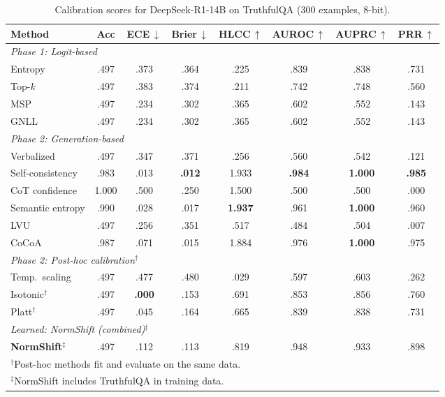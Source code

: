 \documentclass[11pt,a4paper]{article}
\begin{document}
\begin{table}[H]
\centering
\caption{Calibration scores for DeepSeek-R1-14B on TruthfulQA (300 examples, 8-bit).}
\label{tab:full-calibration-deepseek-r1-14b}
\small
\begin{tabular}{@{}lccccccc@{}}
\toprule
Method & Acc & ECE\,$\downarrow$ & Brier\,$\downarrow$ & HLCC\,$\uparrow$
       & AUROC\,$\uparrow$ & AUPRC\,$\uparrow$ & PRR\,$\uparrow$ \\
\midrule
\multicolumn{8}{l}{\emph{Phase 1: Logit-based}} \\
Entropy                  & .497 & .373 & .364 & .225
                 & .839 & .838 & .731 \\
Top-$k$                  & .497 & .383 & .374 & .211
                 & .742 & .748 & .560 \\
MSP                      & .497 & .234 & .302 & .365
                 & .602 & .552 & .143 \\
GNLL                     & .497 & .234 & .302 & .365
                 & .602 & .552 & .143 \\
\midrule
\multicolumn{8}{l}{\emph{Phase 2: Generation-based}} \\
Verbalized               & .497 & .347 & .371 & .256
                 & .560 & .542 & .121 \\
Self-consistency         & .983 & .013 & \textbf{.012} & 1.933
                 & \textbf{.984} & \textbf{1.000} & \textbf{.985} \\
CoT confidence           & 1.000 & .500 & .250 & 1.500
                 & .500 & .500 & .000 \\
Semantic entropy         & .990 & .028 & .017 & \textbf{1.937}
                 & .961 & \textbf{1.000} & .960 \\
LVU                      & .497 & .256 & .351 & .517
                 & .484 & .504 & .007 \\
CoCoA                    & .987 & .071 & .015 & 1.884
                 & .976 & \textbf{1.000} & .975 \\
\midrule
\multicolumn{8}{l}{\emph{Phase 2: Post-hoc calibration$^\dagger$}} \\
Temp.\ scaling           & .497 & .477 & .480 & .029
                 & .597 & .603 & .262 \\
Isotonic$^\dagger$       & .497 & \textbf{.000} & .153 & .691
                 & .853 & .856 & .760 \\
Platt$^\dagger$          & .497 & .045 & .164 & .665
                 & .839 & .838 & .731 \\
\midrule
\multicolumn{8}{l}{\emph{Learned: NormShift (combined)$^\ddagger$}} \\
\textbf{NormShift}$^\ddagger$ & .497 & .112 & .113 & .819
                 & .948 & .933 & .898 \\
\bottomrule
\multicolumn{8}{l}{\scriptsize $^\dagger$Post-hoc methods fit and evaluate on the same data.} \\
\multicolumn{8}{l}{\scriptsize $^\ddagger$NormShift includes TruthfulQA in training data.}
\end{tabular}
\end{table}
\end{document}
